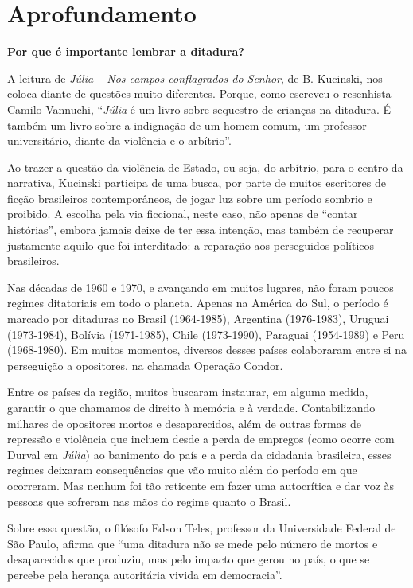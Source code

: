 \documentclass[12pt]{extarticle}
\begin{document}
\section{Aprofundamento}

\textbf{Por que é importante lembrar a ditadura?}

A leitura de \emph{Júlia -- Nos campos conflagrados do Senhor}, de B.
Kucinski, nos coloca diante de questões muito diferentes. Porque, como
escreveu o resenhista Camilo Vannuchi, ``\emph{Júlia} é um livro sobre
sequestro de crianças na ditadura. É também um livro sobre a indignação
de um homem comum, um professor universitário, diante da violência e o
arbítrio''.

Ao trazer a questão da violência de Estado, ou seja, do arbítrio, para o
centro da narrativa, Kucinski participa de uma busca, por parte de
muitos escritores de ficção brasileiros contemporâneos, de jogar luz
sobre um período sombrio e proibido. A escolha pela via ficcional, neste
caso, não apenas de ``contar histórias'', embora jamais deixe de ter
essa intenção, mas também de recuperar justamente aquilo que foi
interditado: a reparação aos perseguidos políticos brasileiros.

Nas décadas de 1960 e 1970, e avançando em muitos lugares, não foram
poucos regimes ditatoriais em todo o planeta. Apenas na América do Sul,
o período é marcado por ditaduras no Brasil (1964-1985), Argentina
(1976-1983), Uruguai (1973-1984), Bolívia (1971-1985), Chile
(1973-1990), Paraguai (1954-1989) e Peru (1968-1980). Em muitos
momentos, diversos desses países colaboraram entre si na perseguição a
opositores, na chamada Operação Condor.

Entre os países da região, muitos buscaram instaurar, em alguma medida,
garantir o que chamamos de direito à memória e à verdade. Contabilizando
milhares de opositores mortos e desaparecidos, além de outras formas de
repressão e violência que incluem desde a perda de empregos (como ocorre
com Durval em \emph{Júlia}) ao banimento do país e a perda da cidadania
brasileira, esses regimes deixaram consequências que vão muito além do
período em que ocorreram. Mas nenhum foi tão reticente em fazer uma
autocrítica e dar voz às pessoas que sofreram nas mãos do regime quanto
o Brasil.

Sobre essa questão, o filósofo Edson Teles, professor da Universidade
Federal de São Paulo, afirma que ``uma ditadura não se mede pelo número
de mortos e desaparecidos que produziu, mas pelo impacto que gerou no
país, o que se percebe pela herança autoritária vivida em democracia''.
\end{document}
